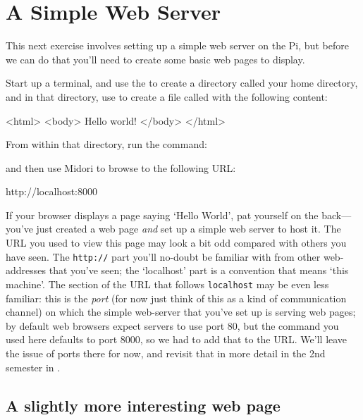 \section{A Simple Web Server}

This next exercise involves setting up a simple web server on the Pi, but before we can do that you'll need to create some basic web pages to display. 

Start up a terminal, and use the  to create a directory called  your home directory, and in that directory, use  to create a file called  with the following content:

\begin{ttoutenv}
<html>
  <body>
    Hello world!
  </body>
</html>
\end{ttoutenv}

From within that directory, run the command:


and then use Midori to browse to the following URL:

\begin{ttoutenv}
http://localhost:8000
\end{ttoutenv}

If your browser displays a page saying `Hello World', pat yourself on the back---you've just created a web page \textit{and} set up a simple web server to host it. The URL you used to view this page may look a bit odd compared with others you have seen. The \texttt{http://} part you'll no-doubt be familiar with from other web-addresses that you've seen; the `localhost' part is a convention that means `this machine'. The section of the URL that follows \texttt{localhost} may be even less familiar: this is the \textit{port} (for now just think of this as a kind of communication channel) on which the simple web-server that you've set up is serving web pages; by default web browsers expect servers to use port 80, but the  command you used here defaults to port 8000, so we had to add that to the URL. We'll leave the issue of ports there for now, and revisit that in more detail in the 2nd semester in . 

\subsection{A slightly more interesting web page}

